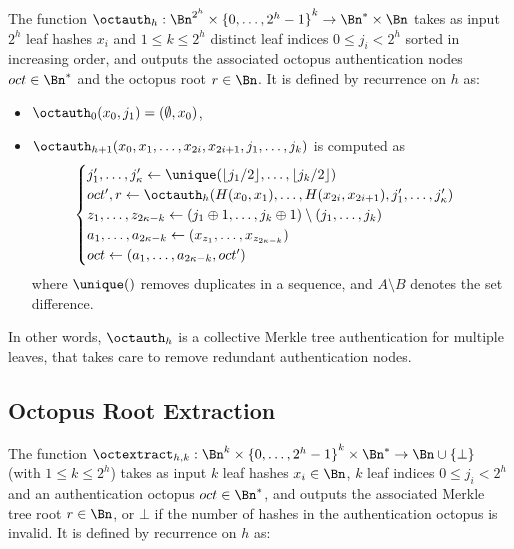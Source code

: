 The function $\octauth_h : \Bn^{2^h} \times {\{0, \ldots, 2^h-1\}}^k \to \Bn^* \times \Bn$ takes as input $2^h$ leaf hashes $x_i$ and $1 \le k \le 2^h$ distinct leaf indices $0 \le j_i < 2^h$ sorted in increasing order, and outputs the associated octopus authentication nodes $oct \in \Bn^*$ and the octopus root $r \in \Bn$.
It is defined by recurrence on $h$ as:

\begin{itemize}
\item $\octauth_0(x_0, j_1) = (\emptyset, x_0)$,
\item $\octauth_{h+1}(x_0, x_1, \ldots, x_{2i}, x_{2i+1}, j_1, \ldots, j_k)$ is computed as
%
\[\begin{cases}
j_1', \ldots, j_\kappa' \gets \unique(\lfloor j_1/2 \rfloor, \ldots, \lfloor j_k/2 \rfloor) \\
oct', r \gets \octauth_h(H(x_0, x_1), \ldots, H(x_{2i}, x_{2i+1}), j_1', \ldots, j_\kappa') \\
z_1, \ldots, z_{2\kappa - k} \gets (j_1 \oplus 1, \ldots, j_k \oplus 1) \setminus (j_1, \ldots, j_k) \\
a_1, \ldots, a_{2\kappa - k} \gets (x_{z_1}, \ldots, x_{z_{2\kappa - k}}) \\
oct \gets (a_1, \ldots, a_{2\kappa - k}, oct')
\end{cases}\]
where $\unique()$ removes duplicates in a sequence, and $A \setminus B$ denotes the set difference.
\end{itemize}

In other words, $\octauth_h$ is a collective Merkle tree authentication for multiple leaves, that takes care to remove redundant authentication nodes.

\subsection{Octopus Root Extraction}

The function $\octextract_{h,k} : \Bn^k \times {\{0, \ldots, 2^h-1\}}^k \times \Bn^* \to \Bn \cup \{\bot\}$ (with $1 \le k \le 2^h$) takes as input $k$ leaf hashes $x_i \in \Bn$, $k$ leaf indices $0 \le j_i < 2^h$ and an authentication octopus $oct \in \Bn^*$, and outputs the associated Merkle tree root $r \in \Bn$, or $\bot$ if the number of hashes in the authentication octopus is invalid.
It is defined by recurrence on $h$ as:

